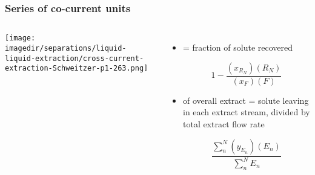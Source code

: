 \begin{frame}\frametitle{Series of co-current units}
	\begin{columns}[t]
			\begin{center}
				\vspace{-12pt}
				{\color{myOrange}{$N=3$ in this illustration}}
				\texttt{[image: \\imagedir/separations/liquid-liquid-extraction/cross-current-extraction-Schweitzer-p1-263.png]}
			\end{center}
			\begin{itemize}
				\item	{\color{purple}{Recovery}} = fraction of solute recovered
					\begin{exampleblock}{}
						\[1 - \displaystyle\frac{(x_{R_N})(R_N)}{(x_F) (F)}\]
					\end{exampleblock}
				
				\vspace{6pt}
				\item	{\color{purple}{Concentration}} of overall extract = solute leaving in each extract stream, divided by total extract flow rate 
					\begin{exampleblock}{}
						\[\frac{\displaystyle \sum_n^N{(y_{E_n})(E_n)}}{ \displaystyle \sum_n^N{E_n}}\]
					\end{exampleblock}
			\end{itemize}
	\end{columns}	
\end{frame}

